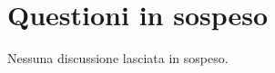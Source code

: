 \documentclass[../verbale-2017-02-28.tex]{subfiles}
\begin{document}
	\section{Questioni in sospeso} 
	
	Nessuna discussione lasciata in sospeso.
	
\end{document}
